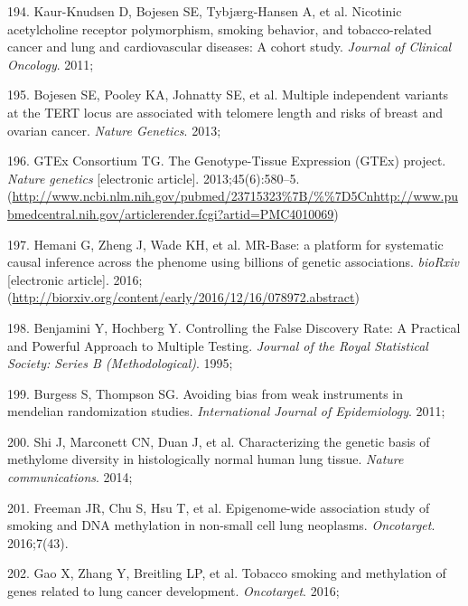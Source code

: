 \documentclass[11pt,oneside]{bristolthesis}
\newenvironment{cslreferences}%
  {}%
  {\par}
\begin{document}
\begin{cslreferences}
\leavevmode\hypertarget{ref-Kaur-Knudsen2011}{}%
194. Kaur-Knudsen D, Bojesen SE, Tybjærg-Hansen A, et al. Nicotinic acetylcholine receptor polymorphism, smoking behavior, and tobacco-related cancer and lung and cardiovascular diseases: A cohort study. \emph{Journal of Clinical Oncology}. 2011;

\leavevmode\hypertarget{ref-Bojesen2013}{}%
195. Bojesen SE, Pooley KA, Johnatty SE, et al. Multiple independent variants at the TERT locus are associated with telomere length and risks of breast and ovarian cancer. \emph{Nature Genetics}. 2013;

\leavevmode\hypertarget{ref-GTExConsortium2013}{}%
196. GTEx Consortium TG. The Genotype-Tissue Expression (GTEx) project. \emph{Nature genetics} {[}electronic article{]}. 2013;45(6):580--5. (\url{http://www.ncbi.nlm.nih.gov/pubmed/23715323\%7B/\%\%7D5Cnhttp://www.pubmedcentral.nih.gov/articlerender.fcgi?artid=PMC4010069})

\leavevmode\hypertarget{ref-Hemani2016}{}%
197. Hemani G, Zheng J, Wade KH, et al. MR-Base: a platform for systematic causal inference across the phenome using billions of genetic associations. \emph{bioRxiv} {[}electronic article{]}. 2016;(\url{http://biorxiv.org/content/early/2016/12/16/078972.abstract})

\leavevmode\hypertarget{ref-Benjamini1995}{}%
198. Benjamini Y, Hochberg Y. Controlling the False Discovery Rate: A Practical and Powerful Approach to Multiple Testing. \emph{Journal of the Royal Statistical Society: Series B (Methodological)}. 1995;

\leavevmode\hypertarget{ref-Burgess2011}{}%
199. Burgess S, Thompson SG. Avoiding bias from weak instruments in mendelian randomization studies. \emph{International Journal of Epidemiology}. 2011;

\leavevmode\hypertarget{ref-Shi2014}{}%
200. Shi J, Marconett CN, Duan J, et al. Characterizing the genetic basis of methylome diversity in histologically normal human lung tissue. \emph{Nature communications}. 2014;

\leavevmode\hypertarget{ref-Freeman2016}{}%
201. Freeman JR, Chu S, Hsu T, et al. Epigenome-wide association study of smoking and DNA methylation in non-small cell lung neoplasms. \emph{Oncotarget}. 2016;7(43).

\leavevmode\hypertarget{ref-Gao2016}{}%
202. Gao X, Zhang Y, Breitling LP, et al. Tobacco smoking and methylation of genes related to lung cancer development. \emph{Oncotarget}. 2016;


\end{cslreferences}
\end{document}

